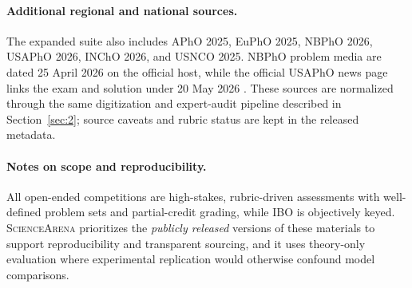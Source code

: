\documentclass[11pt]{article}
\begin{document}
\paragraph{Additional regional and national sources.}
The expanded suite also includes APhO 2025, EuPhO 2025, NBPhO 2026, USAPhO 2026, INChO 2026, and USNCO 2025. NBPhO problem media are dated 25 April 2026 on the official host, while the official USAPhO news page links the exam and solution under 20 May 2026 \citep{nbpho2026_official_event,nbpho2026_media_metadata,usapho2026_official_news}. These sources are normalized through the same digitization and expert-audit pipeline described in Section~\ref{sec:2}; source caveats and rubric status are kept in the released metadata.

\paragraph{Notes on scope and reproducibility.}
All open-ended competitions are high-stakes, rubric-driven assessments with well-defined problem sets and partial-credit grading, while IBO is objectively keyed. \textsc{ScienceArena} prioritizes the \emph{publicly released} versions of these materials to support reproducibility and transparent sourcing, and it uses theory-only evaluation where experimental replication would otherwise confound model comparisons.



% 


\end{document}
